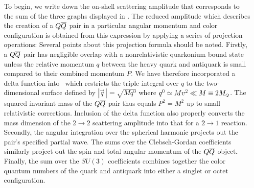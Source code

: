	To begin, we write down the on-shell scattering amplitude 
%
\eqn{}
%
that corresponds to the sum of the three graphs displayed in \ggQQbargraphs.
The reduced amplitude which describes the creation of a $Q{\overline Q}$ pair in a 
particular angular momentum and color configuration is obtained from this 
expression by applying a series of projection operations:
%
\eqn{}
%
Several points about this projection formula should be noted.  Firstly, a 
$Q{\overline Q}$ pair has negligible overlap with a nonrelativistic quarkonium bound 
state unless the relative momentum $q$ between the heavy quark and antiquark is 
small compared to their combined momentum $P$.  We have therefore incorporated 
a delta function into \projection\ which restricts the triple integral over 
$q$ to the two-dimensional surface defined by $|{\vec q}\, | = \sqrt{M q^0}$ 
where $q^0 \simeq M v^2 \ll M \equiv 2 M_{\scriptscriptstyle Q}$.  The squared invariant mass of 
the $Q{\overline Q}$ pair thus equals $P^2 = M^2$ up to small relativistic 
corrections.  Inclusion of the delta function also 
properly converts the mass dimension of the $2 \to 2$ scattering amplitude into 
that for a $2 \to 1$ reaction.  Secondly, the angular integration over the 
spherical harmonic projects out the pair's specified partial wave.  The sums 
over the Clebsch-Gordan coefficients similarly project out the spin 
and total angular momentum of the $Q{\overline Q}$ object.  Finally, the sum 
over the $SU(3)$ coefficients 
%
\eqn{}
%
combines together the color quantum numbers of the quark and antiquark into 
either a singlet or octet configuration. 

